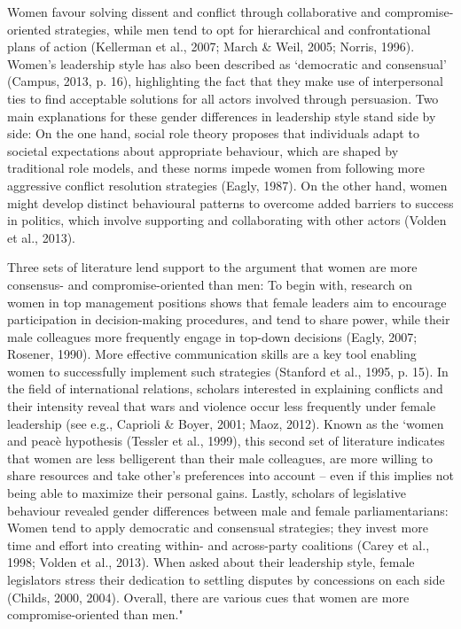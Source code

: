 Women favour solving dissent and conflict through collaborative and compromise-oriented strategies, while men tend to opt for hierarchical and confrontational plans of action (Kellerman et al., 2007; March & Weil, 2005; Norris, 1996). Women’s leadership style has also been described as ‘democratic and consensual’ (Campus, 2013, p. 16), highlighting the fact that they make use of interpersonal ties to find acceptable solutions for all actors involved through persuasion. Two main explanations for these gender differences in leadership style stand side by side: On the one hand, social role theory proposes that individuals adapt to societal expectations about appropriate behaviour, which are shaped by traditional role models, and these norms impede women from following more aggressive conflict resolution strategies (Eagly, 1987). On the other hand, women might develop distinct behavioural patterns to overcome added barriers to success in politics, which involve supporting and collaborating with other actors (Volden et al., 2013).

Three sets of literature lend support to the argument that women are more consensus- and compromise-oriented than men: To begin with, research on women in top management positions shows that female leaders aim to encourage participation in decision-making procedures, and tend to share power, while their male colleagues more frequently engage in top-down decisions (Eagly, 2007; Rosener, 1990). More effective communication skills are a key tool enabling women to successfully implement such strategies (Stanford et al., 1995, p. 15). In the field of international relations, scholars interested in explaining conflicts and their intensity reveal that wars and violence occur less frequently under female leadership (see e.g., Caprioli & Boyer, 2001; Maoz, 2012). Known as the ‘women and peacè hypothesis (Tessler et al., 1999), this second set of literature indicates that women are less belligerent than their male colleagues, are more willing to share resources and take other’s preferences into account – even if this implies not being able to maximize their personal gains. Lastly, scholars of legislative behaviour revealed gender differences between male and female parliamentarians: Women tend to apply democratic and consensual strategies; they invest more time and effort into creating within- and across-party coalitions (Carey et al., 1998; Volden et al., 2013). When asked about their leadership style, female legislators stress their dedication to settling disputes by concessions on each side (Childs, 2000, 2004). Overall, there are various cues that women are more compromise-oriented than men."